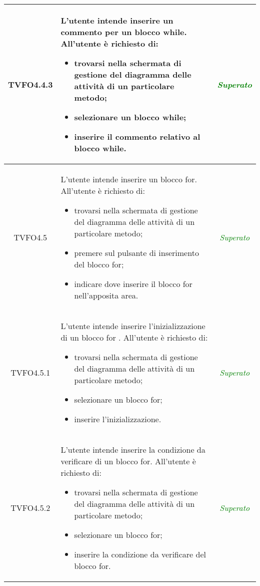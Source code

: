 \begin{longtable}{|c|>{}m{8cm}|c|}
\hypertarget{TVFO4.4.3}{TVFO4.4.3} & L'utente intende inserire un commento per un blocco while.
All'utente è richiesto di:
\begin{itemize}
	\item trovarsi nella schermata di gestione del diagramma delle attività di un particolare metodo;
	\item selezionare un blocco while;
	\item inserire il commento relativo al blocco while.
\end{itemize} & \textcolor{Green}{\textit{Superato}}\\ \hline

\hypertarget{TVFO4.5}{TVFO4.5} & L'utente intende inserire un blocco for.
All'utente è richiesto di:
\begin{itemize}
	\item trovarsi nella schermata di gestione del diagramma delle attività di un particolare metodo;
	\item premere sul pulsante di inserimento del blocco for;
	\item indicare dove inserire il blocco for nell'apposita area.
\end{itemize} & \textcolor{Green}{\textit{Superato}}\\ \hline

\hypertarget{TVFO4.5.1}{TVFO4.5.1} & L'utente intende inserire l'inizializzazione di un blocco for .
All'utente è richiesto di:
\begin{itemize}
	\item trovarsi nella schermata di gestione del diagramma delle attività di un particolare metodo;
	\item selezionare un blocco for;
	\item inserire l'inizializzazione.
\end{itemize} & \textcolor{Green}{\textit{Superato}}\\ \hline

\hypertarget{TVFO4.5.2}{TVFO4.5.2} & L'utente intende inserire la condizione da verificare di un blocco for.
All'utente è richiesto di:
\begin{itemize}
	\item trovarsi nella schermata di gestione del diagramma delle attività di un particolare metodo;
	\item selezionare un blocco for;
	\item inserire la condizione da verificare del blocco for.
\end{itemize} & \textcolor{Green}{\textit{Superato}}\\ \hline


\end{longtable}
